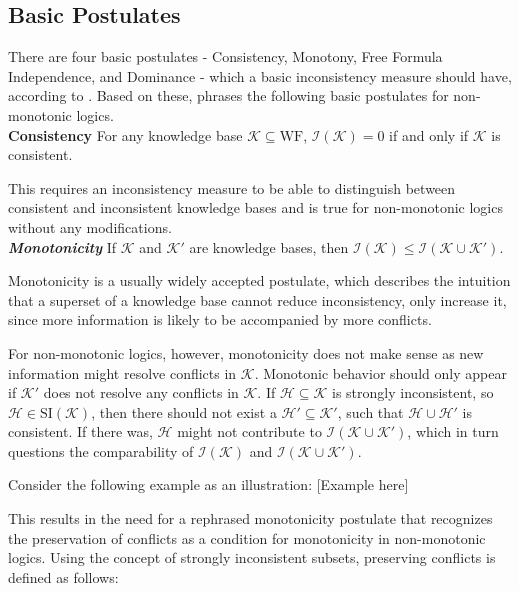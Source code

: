 \subsection{Basic Postulates}
There are four basic postulates - Consistency, Monotony, Free Formula Independence, and Dominance - which a basic inconsistency measure should have, according to \cite{hunter_measure_2010}. Based on these, \cite{ulbricht_handling_2020} phrases the following basic postulates for non-monotonic logics.
\\
\textbf{Consistency}
For any knowledge base \(\mathcal{K} \subseteq \text{WF}\), \(\mathcal{I}(\mathcal{K}) = 0\) if and only if \(\mathcal{K}\) is consistent.

This requires an inconsistency measure to be able to distinguish between consistent and inconsistent knowledge bases and is true for non-monotonic logics without any modifications.
\\
\textit{\textbf{Monotonicity}}
If \(\mathcal{K}\) and \(\mathcal{K}'\) are knowledge bases, then \(\mathcal{I}(\mathcal{K}) \leq \mathcal{I}(\mathcal{K \cup \mathcal{K}'})\).

Monotonicity is a usually widely accepted postulate, which describes the intuition that a superset of a knowledge base cannot reduce inconsistency, only increase it, since more information is likely to be accompanied by more conflicts.

For non-monotonic logics, however, monotonicity does not make sense as new information might resolve conflicts in \(\mathcal{K}\). Monotonic behavior should only appear if \(\mathcal{K}'\) does not resolve any conflicts in \(\mathcal{K}\). If \(\mathcal{H} \subseteq \mathcal{K}\) is strongly inconsistent, so \(\mathcal{H} \in \text{SI}(\mathcal{K})\), then there should not exist a \(\mathcal{H}' \subseteq \mathcal{K}'\), such that \(\mathcal{H} \cup \mathcal{H}'\) is consistent. If there was, \(\mathcal{H}\) might not contribute to \(\mathcal{I}(\mathcal{K} \cup \mathcal{K}')\), which in turn questions the comparability of \(\mathcal{I}(\mathcal{K})\) and \(\mathcal{I}(\mathcal{K} \cup \mathcal{K}')\).


Consider the following example as an illustration:
[Example here]

This results in the need for a rephrased monotonicity postulate that recognizes the preservation of conflicts as a condition for monotonicity in non-monotonic logics. Using the concept of strongly inconsistent subsets, preserving conflicts is defined as follows:

